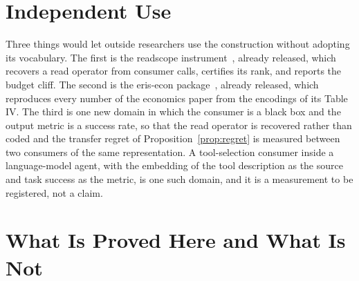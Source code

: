 \documentclass[11pt]{article}
\theoremstyle{definition}
\theoremstyle{remark}
\begin{document}
\section{Independent Use}
\label{sec:use}

Three things would let outside researchers use the construction without adopting its vocabulary.
The first is the readscope instrument~\cite{bond2026readscope}, already released, which recovers a read operator from consumer calls, certifies its rank, and reports the budget cliff.
The second is the eris-econ package~\cite{bond2026eriseconsw}, already released, which reproduces every number of the economics paper from the encodings of its Table IV.
The third is one new domain in which the consumer is a black box and the output metric is a success rate, so that the read operator is recovered rather than coded and the transfer regret of Proposition~\ref{prop:regret} is measured between two consumers of the same representation.
A tool-selection consumer inside a language-model agent, with the embedding of the tool description as the source and task success as the metric, is one such domain, and it is a measurement to be registered, not a claim.

\section{What Is Proved Here and What Is Not}
\end{document}
